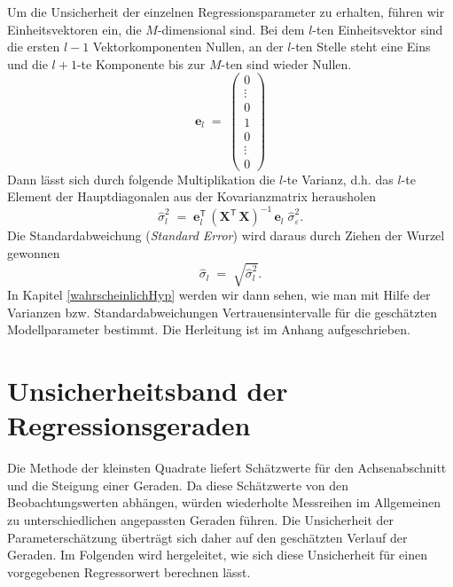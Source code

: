 Um die Unsicherheit der einzelnen Regressionsparameter zu erhalten, führen wir Einheitsvektoren ein, die $M$-dimensional sind.
Bei dem $l$-ten Einheitsvektor sind die ersten $l-1$ Vektorkomponenten Nullen, an der $l$-ten Stelle steht eine Eins
und die $l+1$-te Komponente bis zur $M$-ten sind wieder Nullen.
\begin{equation}
\boldsymbol{e}_l \; = \;
\left(\begin{array}{c}
0\\
\vdots\\
0\\
1\\
0\\
\vdots\\
0
\end{array}\right)
\end{equation}
Dann lässt sich durch folgende Multiplikation die $l$-te Varianz, d.h. das $l$-te Element
der Hauptdiagonalen aus der Kovarianzmatrix herausholen
\begin{equation}
\hat \sigma_l^2 \; = \; \boldsymbol{e}_l^\mathsf{T} \, \left( \mathbf{X}^\mathsf{T}  \, \mathbf{X} \right)^{-1} \, \boldsymbol{e}_l  \; \hat \sigma_{\varepsilon}^2 .
\label{eq:URegressparamsMatrix}
\end{equation}
Die Standardabweichung (\textsl{Standard Error}) wird daraus durch Ziehen der Wurzel
gewonnen
\begin{equation}
\hat \sigma_l \; = \; \sqrt{\hat \sigma_l^2} .
\end{equation}
In Kapitel \ref{wahrscheinlichHyp} werden wir dann sehen, wie man mit Hilfe der Varianzen bzw. Standardabweichungen Vertrauensintervalle für die geschätzten Modellparameter bestimmt.
Die Herleitung ist im Anhang aufgeschrieben.


\section{Unsicherheitsband der Regressionsgeraden}
\label{sec:unsicherheitsband_regressionsgerade}

Die Methode der kleinsten Quadrate liefert Schätzwerte für den
Achsenabschnitt und die Steigung einer Geraden. Da diese Schätzwerte von
den Beobachtungswerten abhängen, würden wiederholte Messreihen im
Allgemeinen zu unterschiedlichen angepassten Geraden führen. Die
Unsicherheit der Parameterschätzung überträgt sich daher auf den
geschätzten Verlauf der Geraden. Im Folgenden wird hergeleitet, wie sich
diese Unsicherheit für einen vorgegebenen Regressorwert berechnen lässt.

